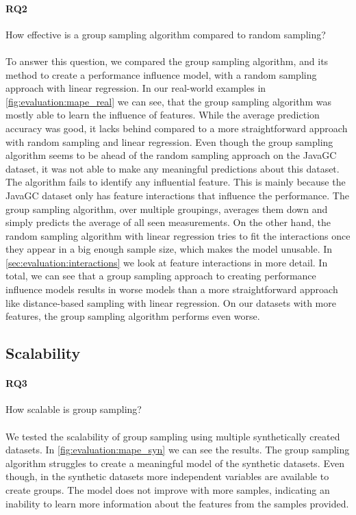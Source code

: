 \documentclass[../thesis.tex]{subfiles}
\begin{document}
\paragraph{RQ2} How effective is a group sampling algorithm compared to random sampling?
\paragraph{}
To answer this question, we compared the group sampling algorithm, and its method to create
a performance influence model, with a random sampling approach with linear regression.
In our real-world examples in \autoref{fig:evaluation:mape_real} we can see, that the group
sampling algorithm was mostly able to learn the influence of features. While the average
prediction accuracy was good, it lacks behind compared to a more straightforward approach with
random sampling and linear regression. Even though the group sampling algorithm seems to be
ahead of the random sampling approach on the JavaGC dataset, it was not able to make any meaningful
predictions about this dataset. The algorithm fails to identify any influential feature.
This is mainly because the JavaGC dataset only has feature interactions that influence the performance.
The group sampling algorithm, over multiple groupings, averages them down and
simply predicts the average of all seen measurements. On the other hand, the random sampling
algorithm with linear regression tries to fit the interactions once they appear in
a big enough sample size, which makes the model unusable.
In \autoref{sec:evaluation:interactions} we look at feature interactions in more detail.
In total, we can see that a group sampling approach to creating performance influence models
results in worse models than a more straightforward approach like distance-based sampling \cite{kaltenecker2019distance}
with linear regression. On our datasets with more features, the group sampling algorithm
performs even worse. 



\subsection{Scalability}\label{sec:evaluation:scalability}
\paragraph{RQ3} How scalable is group sampling?
\paragraph{}
We tested the scalability of group sampling using multiple synthetically created datasets.
In \autoref{fig:evaluation:mape_syn} we can see the results.
The group sampling algorithm struggles to create a meaningful model of the synthetic datasets.
Even though, in the synthetic datasets more independent variables are available to create groups.
The model does not improve with more samples, indicating an inability to learn more
information about the features from the samples provided.
\end{document}
